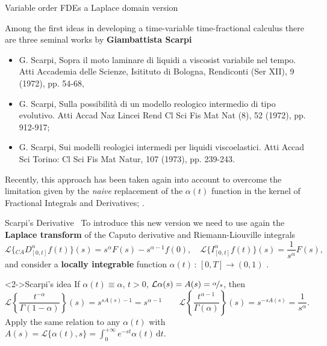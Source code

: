\documentclass[aspectratio=169,xcolor=dvipsnames]{beamer}
\begin{document}
\begin{frame}{Variable order FDEs a Laplace domain version}

Among the first ideas in developing a time-variable time-fractional calculus there are three seminal works by \textbf{Giambattista Scarpi}
\begin{itemize}
\item[\faFile] G. Scarpi, Sopra il moto laminare di liquidi a viscosist variabile nel tempo. Atti Accademia delle Scienze, Isitituto di Bologna, Rendiconti (Ser XII), 9 (1972), pp. 54-68,
\item[\faFile] G. Scarpi, Sulla possibilità di un modello reologico intermedio di tipo evolutivo. Atti Accad Naz Lincei Rend Cl Sci Fis Mat Nat (8), 52 (1972), pp. 912-917;
\item[\faFile] G. Scarpi, Sui modelli reologici intermedi per liquidi viscoelastici. Atti Accad Sci Torino: Cl Sci Fis Mat Natur, 107 (1973), pp. 239-243.
\end{itemize}

Recently, this approach has been taken again into account to overcome the limitation given by the \emph{naive} replacement of the $\alpha(t)$ function in the kernel of Fractional Integrals and Derivatives; \parencite{MR4268683}.

\end{frame}

\begin{frame}{Scarpi's Derivative~{\Large\parencite{MR4268683}}}
To introduce this new version we need to use again the \textbf{Laplace transform} of the Caputo derivative and Riemann-Liouville integrals
\[
\mathcal{L}\{ {}_{CA}D^{\alpha}_{[0,t]} f(t) \}(s) = s^\alpha F(s) - s^{\alpha-1} f(0), \quad \mathcal{L}\{ I^{\alpha}_{[0,t]} f(t) \}(s) = \frac{1}{s^\alpha}F(s),
\]
and consider a \textbf{locally integrable} function $\alpha(t)\,:\,[0,T] \rightarrow (0,1)$ .

\begin{exampleblock}<2->{\faLightbulb\;Scarpi's idea}
If $\alpha(t) \equiv \alpha$, $t > 0$, $\mathcal{L}{\alpha}(s) = A(s) = \nicefrac{\alpha}{s}$, then
\[
\mathcal{L}\left\lbrace \frac{t^{-\alpha}}{\Gamma(1-\alpha)} \right\rbrace(s) = s^{s A(s) - 1} = s^{\alpha-1} \qquad \mathcal{L}\left\lbrace \frac{t^{\alpha-1}}{\Gamma(\alpha)} \right\rbrace(s) = s^{- s A(s)} = \frac{1}{s^\alpha}.
\]
\faLightbulb\;Apply the same relation to any $\alpha(t)$ with $A(s) = \mathcal{L}\{\alpha(t),s\} = \int_{0}^{+\infty} e^{-st} \alpha(t)\,\mathrm{d}t$.
\end{exampleblock}

\end{frame}
\end{document}
